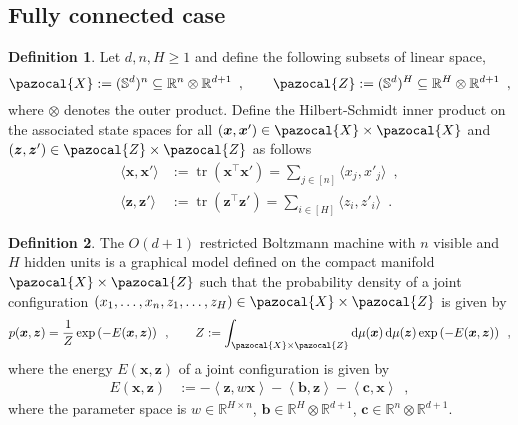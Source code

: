 \documentclass[12pt]{article}
\DeclareMathOperator{\tr}{tr}
\theoremstyle{definition}%
\theoremstyle{definition}
\newtheorem{defn}{Definition}[section]
\theoremstyle{remark}
\begin{document}
\subsection{Fully connected case}
\begin{defn}
Let $d, n, H \geq 1$ and define the following subsets of linear space,
\begin{equation}
	\pazocal{X} := (\mathbb{S}^d)^n \subseteq \mathbb{R}^n \otimes \mathbb{R}^{d+1} \enspace , \quad \quad \pazocal{Z} := (\mathbb{S}^d)^H \subseteq \mathbb{R}^H \otimes \mathbb{R}^{d+1} \enspace ,
\end{equation}
where $\otimes$ denotes the outer product. Define the Hilbert-Schmidt inner product on the associated state spaces for all $(\bm{x},\bm{x}') \in \pazocal{X} \times \pazocal{X}$ and $(\bm{z},\bm{z}') \in \pazocal{Z} \times \pazocal{Z}$ as follows
\begin{align}
	\langle \bm{x} , \bm{x}' \rangle
		& := \tr(\bm{x}^\top \bm{x}') = \sum_{j \in [n]} \langle x_j, x'_j \rangle \enspace , \\
	\langle \bm{z} , \bm{z}' \rangle
		& := \tr(\bm{z}^\top \bm{z}') = \sum_{i \in [H]} \langle z_i, z'_i \rangle \enspace .
\end{align}
\end{defn}
\begin{defn}
The $O(d+1)$ restricted Boltzmann machine with $n$ visible and $H$ hidden units is a graphical model defined on the compact manifold $\pazocal{X}\times\pazocal{Z}$ such that the probability density of a joint configuration $(x_1,\ldots, x_{n},z_1,\ldots,z_H) \in \pazocal{X}\times \pazocal{Z}$ is given by
\begin{equation}
	p(\bm{x},\bm{z}) = \frac{1}{Z} \exp \left(-E(\bm{x},\bm{z})\right) \enspace , \quad \quad Z := \int_{\pazocal{X}\times \pazocal{Z}} {\rm d}\mu(\bm{x}) \, {\rm d}\mu(\bm{z}) \exp\left(-E(\bm{x},\bm{z})\right) \enspace ,
\end{equation}
where the energy $E(\bm{x},\bm{z})$ of a joint configuration is given by
\begin{align}
	E(\bm{x},\bm{z})
		& := - \left\langle \bm{z}, w \bm{x} \right\rangle - \left\langle \bm{b}, \bm{z} \right\rangle - \left\langle \bm{c}, \bm{x} \right \rangle\enspace ,
\end{align}
where the parameter space is $w \in \mathbb{R}^{H \times n}$, $\bm{b} \in \mathbb{R}^{H}\otimes \mathbb{R}^{d+1}$, $\bm{c} \in \mathbb{R}^n \otimes \mathbb{R}^{d+1}$.
\end{defn}
\end{document}
